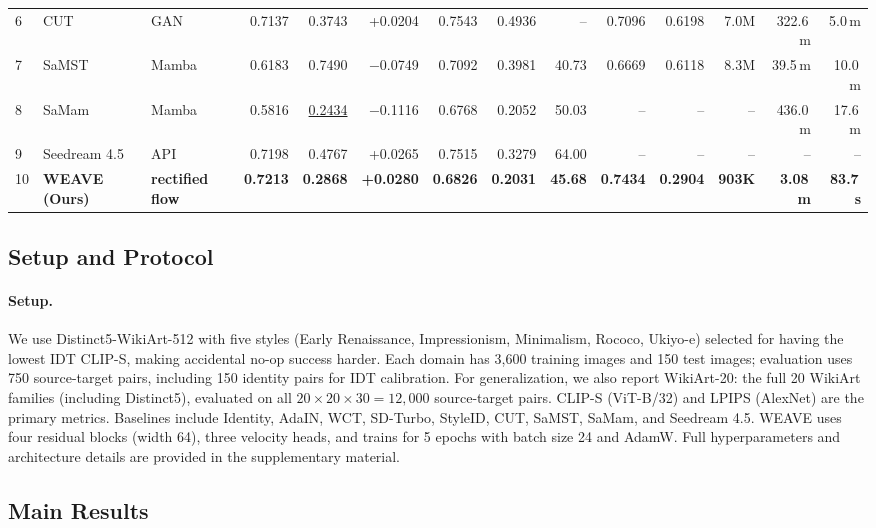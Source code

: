\documentclass[letterpaper]{article}
\begin{document}
\begin{table}[t]
\begin{tabular}{@{}lllrrrrrrrrrrr@{}}
6 & CUT & GAN & 0.7137 & 0.3743 & +0.0204 & 0.7543 & 0.4936 & -- & 0.7096 & 0.6198 & 7.0M & 322.6\,m & 5.0\,m \\
7 & SaMST & Mamba & 0.6183 & 0.7490 & $-$0.0749 & 0.7092 & 0.3981 & 40.73 & 0.6669 & 0.6118 & 8.3M & 39.5\,m & 10.0\,m \\
8 & SaMam & Mamba & 0.5816 & \underline{0.2434} & $-$0.1116 & 0.6768 & 0.2052 & 50.03 & -- & -- & -- & 436.0\,m & 17.6\,m \\
9 & Seedream 4.5 & API & 0.7198 & 0.4767 & +0.0265 & 0.7515 & 0.3279 & 64.00 & -- & -- & -- & -- & -- \\
\midrule
10 & \textbf{WEAVE (Ours)} & \textbf{rectified flow} & \textbf{0.7213} & \textbf{0.2868} & \textbf{+0.0280} & \textbf{0.6826} & \textbf{0.2031} & \textbf{45.68} & \textbf{0.7434} & \textbf{0.2904} & \textbf{903K} & \textbf{3.08\,m} & \textbf{83.7\,s} \\
\bottomrule
\end{tabular}
\end{table}

\subsection{Setup and Protocol}

\paragraph{Setup.}
We use Distinct5-WikiArt-512 with five styles (Early Renaissance, Impressionism, Minimalism, Rococo, Ukiyo-e) selected for having the lowest IDT CLIP-S, making accidental no-op success harder.
Each domain has 3{,}600 training images and 150 test images; evaluation uses 750 source-target pairs, including 150 identity pairs for IDT calibration.
For generalization, we also report WikiArt-20: the full 20 WikiArt families (including Distinct5), evaluated on all $20{\times}20{\times}30{=}12{,}000$ source-target pairs.
CLIP-S (ViT-B/32) and LPIPS (AlexNet) are the primary metrics.
Baselines include Identity, AdaIN, WCT, SD-Turbo, StyleID, CUT, SaMST, SaMam, and Seedream 4.5.
WEAVE uses four residual blocks (width 64), three velocity heads, and trains for 5 epochs with batch size 24 and AdamW.
Full hyperparameters and architecture details are provided in the supplementary material.

\subsection{Main Results}
\end{document}
